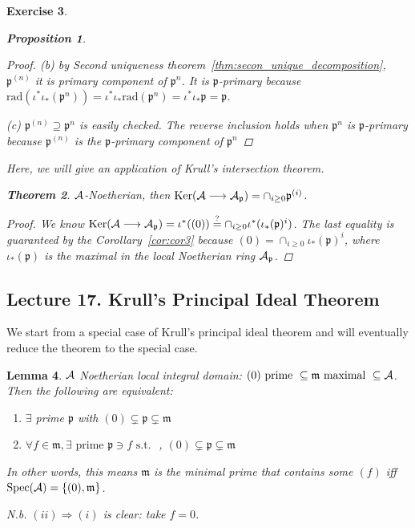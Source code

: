 \documentclass[11pt]{article}
\newtheorem{thm}{Theorem}[section]
\newtheorem{prop}[thm]{Proposition}
\newtheorem{lemma}[thm]{Lemma}
\newtheorem{exercise}[thm]{Exercise}
\newcommand{\scm}{{\mathfrak m}}
\newcommand{\scp}{{\mathfrak p}}
\newcommand{\cala}{{\cal A}}
\newcommand{\Lrta}{\Longrightarrow}
\newcommand{\lrta}{\longrightarrow}
\begin{document}
\begin{exercise}
\begin{prop}
\begin{proof}
(b) by Second uniqueness theorem~\ref{thm:secon_unique_decomposition}, $\scp^{(n)}$ it is primary component of $\scp^n$. It is $\scp$-primary because $\text{rad}(\iota^*\iota_*(\scp^n))=\iota^*\iota_*\text{rad}(\scp^n)=\iota^*\iota_*\scp=\scp$.

(c) $\scp^{(n)}\supseteq\scp^n$ is easily checked. The reverse inclusion holds when $\scp^n$ is $\scp$-primary because $\scp^{(n)}$ is the $\scp$-primary component of $\scp^n$ 
\end{proof}
\end{prop}
Here, we will give an application of Krull's intersection theorem.
\begin{thm}\label{thm:Noetherian_localization_kernel}
 $\cala$-Noetherian, then $ \text{Ker}(\cala\lrta \cala_\scp)=\cap_{i\geq 0}\scp^{(i)}$.
\end{thm}
\begin{proof}
We know $\text{Ker}(\cala\lrta \cala_\scp)=\iota^*((0))\overset{?}{=}\cap_{i\geq 0}\iota^*(\iota_*(\scp)^i)$.
 The last equality is guaranteed by the Corollary~\ref{cor:cor3} because $(0)=\cap_{i\geq 0}\iota_*(\scp)^i$, where $\iota_*(\scp)$ is the maximal in the local Noetherian ring $\cala_\scp$. 
\end{proof}
\end{exercise}



\subsection{Lecture 17. Krull's Principal Ideal Theorem}
We start from a special case of Krull's principal ideal theorem and will eventually reduce the theorem to the special case.
\begin{lemma}\label{lem_5}
$\cala$ Noetherian local integral domain: $(0)\text{ prime } \subseteq \scm \text{ maximal }\subseteq \cala$. Then the following are equivalent:
\begin{enumerate}[label=(\roman*)]
\item $\exists $ prime $\scp$ with $(0)\subsetneq \scp\subsetneq \scm$
\item $\forall f\in\scm,\exists\text{ prime }\scp\ni f \text{ s.t. }$ , $(0)\subsetneq \scp\subsetneq \scm$
\end{enumerate}
In other words, this means $\scm$ is the minimal prime that contains some $(f)$ iff $\text{Spec}(\cala)=\{(0),\scm\}$. 

N.b. $(ii)\Lrta(i)$ is clear: take $f=0$.
\end{lemma}
\end{document}
